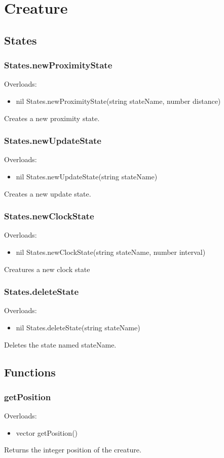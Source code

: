 \documentclass{book}
\newenvironment{ulist}
	{\begin{itemize}
			\itemsep0em}
	{\end{itemize}}
\begin{document}
\section{Creature}
\subsection{States}
\subsubsection{States.newProximityState}
Overloads:
\begin{ulist}
	\item nil States.newProximityState(string stateName, number distance)
\end{ulist}
Creates a new proximity state.

\subsubsection{States.newUpdateState}
Overloads:
\begin{ulist}
	\item nil States.newUpdateState(string stateName)
\end{ulist}
Creates a new update state.

\subsubsection{States.newClockState}
Overloads:
\begin{ulist}
	\item nil States.newClockState(string stateName, number interval)
\end{ulist}
Creatures a new clock state

\subsubsection{States.deleteState}
Overloads:
\begin{ulist}
	\item nil States.deleteState(string stateName)
\end{ulist}
Deletes the state named stateName.


\subsection{Functions}
\subsubsection{getPosition}
Overloads:
\begin{ulist}
	\item vector getPosition()
\end{ulist}
Returns the integer position of the creature.
\end{document}
